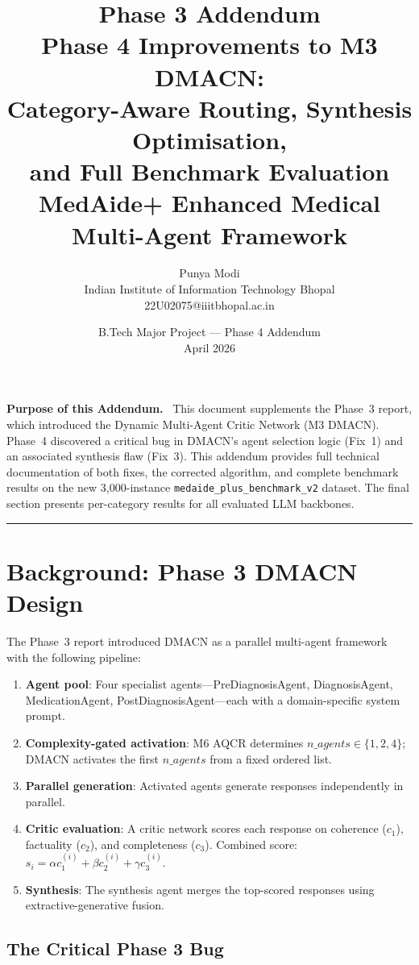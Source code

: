 \documentclass[a4paper,12pt]{article}
\title{
  \textbf{Phase 3 Addendum}\\[4pt]
  \large Phase 4 Improvements to M3 DMACN:\\
  Category-Aware Routing, Synthesis Optimisation,\\
  and Full Benchmark Evaluation\\[2pt]
  \normalsize MedAide+ Enhanced Medical Multi-Agent Framework
}
\author{Punya Modi \\ \small Indian Institute of Information Technology Bhopal \\ \small 22U02075@iiitbhopal.ac.in}
\date{B.Tech Major Project --- Phase 4 Addendum \\ April 2026}
\begin{document}
\maketitle
\thispagestyle{fancy}

\noindent\textbf{Purpose of this Addendum.}~
This document supplements the Phase~3 report, which introduced the Dynamic
Multi-Agent Critic Network (M3 DMACN). Phase~4 discovered a critical bug
in DMACN's agent selection logic (Fix~1) and an associated synthesis flaw
(Fix~3). This addendum provides full technical documentation of both fixes,
the corrected algorithm, and complete benchmark results on the new
3{,}000-instance \texttt{medaide\_plus\_benchmark\_v2} dataset. The final
section presents per-category results for all evaluated LLM backbones.

\hrule\medskip

\section{Background: Phase 3 DMACN Design}

The Phase~3 report introduced DMACN as a parallel multi-agent framework
with the following pipeline:
\begin{enumerate}[noitemsep]
  \item \textbf{Agent pool}: Four specialist agents---PreDiagnosisAgent,
        DiagnosisAgent, MedicationAgent, PostDiagnosisAgent---each with
        a domain-specific system prompt.
  \item \textbf{Complexity-gated activation}: M6 AQCR determines
        $n\_agents \in \{1, 2, 4\}$; DMACN activates the first $n\_agents$
        from a fixed ordered list.
  \item \textbf{Parallel generation}: Activated agents generate responses
        independently in parallel.
  \item \textbf{Critic evaluation}: A critic network scores each response
        on coherence ($c_1$), factuality ($c_2$), and completeness ($c_3$).
        Combined score: $s_i = \alpha c_1^{(i)} + \beta c_2^{(i)} + \gamma c_3^{(i)}$.
  \item \textbf{Synthesis}: The synthesis agent merges the top-scored
        responses using extractive-generative fusion.
\end{enumerate}

\subsection{The Critical Phase 3 Bug}
\end{document}

